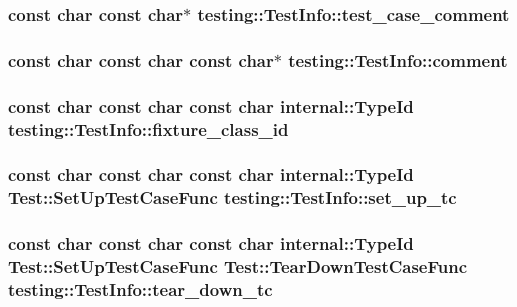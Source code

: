 \subsubsection{\setlength{\rightskip}{0pt plus 5cm}const char const char$\ast$ {\bf testing::TestInfo::test\_\-case\_\-comment}\hspace{0.3cm}{\tt  [package]}}\label{classtesting_1_1TestInfo_f52d0a54d1988531c00a50ce9ca64e59}


\subsubsection{\setlength{\rightskip}{0pt plus 5cm}const char const char const char$\ast$ {\bf testing::TestInfo::comment}\hspace{0.3cm}{\tt  [package]}}\label{classtesting_1_1TestInfo_7b28e513de2226d67e1d0f3cf129c93b}


\subsubsection{\setlength{\rightskip}{0pt plus 5cm}const char const char const char {\bf internal::TypeId} {\bf testing::TestInfo::fixture\_\-class\_\-id}\hspace{0.3cm}{\tt  [package]}}\label{classtesting_1_1TestInfo_a50374588be33bcee7b1b28c4a0d89fb}


\subsubsection{\setlength{\rightskip}{0pt plus 5cm}const char const char const char {\bf internal::TypeId} Test::SetUpTestCaseFunc {\bf testing::TestInfo::set\_\-up\_\-tc}\hspace{0.3cm}{\tt  [package]}}\label{classtesting_1_1TestInfo_8191266a160e91d889bbea316a7883ef}


\subsubsection{\setlength{\rightskip}{0pt plus 5cm}const char const char const char {\bf internal::TypeId} Test::SetUpTestCaseFunc Test::TearDownTestCaseFunc {\bf testing::TestInfo::tear\_\-down\_\-tc}\hspace{0.3cm}{\tt  [package]}}\label{classtesting_1_1TestInfo_beba20073b35ead7e153d76034918252}


